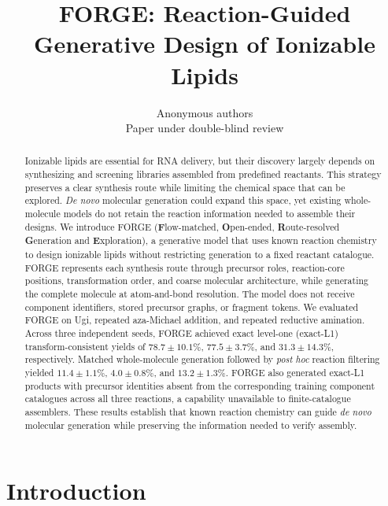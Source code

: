 \documentclass{article}
\title{FORGE: Reaction-Guided Generative Design of Ionizable Lipids}
\author{Anonymous authors\\Paper under double-blind review}
\begin{document}
\maketitle

\begin{abstract}
Ionizable lipids are essential for RNA delivery, but their discovery largely depends on synthesizing and screening libraries assembled from predefined reactants. This strategy preserves a clear synthesis route while limiting the chemical space that can be explored. \textit{De novo} molecular generation could expand this space, yet existing whole-molecule models do not retain the reaction information needed to assemble their designs. We introduce FORGE (\textbf{F}low-matched, \textbf{O}pen-ended, \textbf{R}oute-resolved \textbf{G}eneration and \textbf{E}xploration), a generative model that uses known reaction chemistry to design ionizable lipids without restricting generation to a fixed reactant catalogue. FORGE represents each synthesis route through precursor roles, reaction-core positions, transformation order, and coarse molecular architecture, while generating the complete molecule at atom-and-bond resolution. The model does not receive component identifiers, stored precursor graphs, or fragment tokens. We evaluated FORGE on Ugi, repeated aza-Michael addition, and repeated reductive amination. Across three independent seeds, FORGE achieved exact level-one (exact-L1) transform-consistent yields of $78.7\pm10.1\%$, $77.5\pm3.7\%$, and $31.3\pm14.3\%$, respectively. Matched whole-molecule generation followed by \textit{post hoc} reaction filtering yielded $11.4\pm1.1\%$, $4.0\pm0.8\%$, and $13.2\pm1.3\%$. FORGE also generated exact-L1 products with precursor identities absent from the corresponding training component catalogues across all three reactions, a capability unavailable to finite-catalogue assemblers. These results establish that known reaction chemistry can guide \textit{de novo} molecular generation while preserving the information needed to verify assembly.
\end{abstract}

\section{Introduction}
\end{document}
